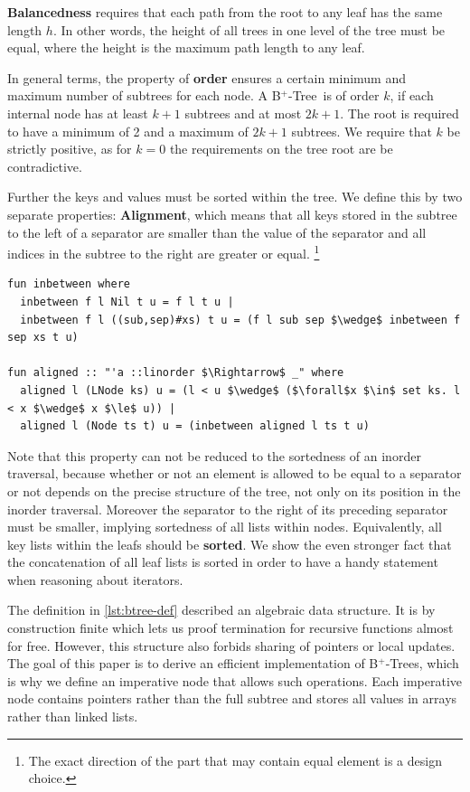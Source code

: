 \documentclass[a4paper,UKenglish,cleveref, autoref, thm-restate]{lipics-v2021}
\newcommand{\btree}{B$^+$-Tree}
\newcommand{\btrees}{B$^+$-Trees}
\begin{document}
\textbf{Balancedness} requires
that each path from the root to any leaf has the same length $h$.
In other words, the height of all trees in one level of the tree must be equal,
where the height is the maximum path length to any leaf.

In general terms, the property of \textbf{order} ensures a certain minimum and maximum
number of subtrees for each node.
A \btree\ is of order $k$, if each internal node has at least $k+1$
subtrees and at most $2k+1$.
The root is required to have a minimum of 2 and a maximum of $2k+1$ subtrees.
We require that $k$ be strictly positive, as for $k = 0$ the requirements on the tree
root are be contradictive.

Further the keys and values must be sorted within the tree.
We define this by two separate properties: \textbf{Alignment}, which means that all keys stored
in the subtree to the left of a separator are smaller than the value of the separator
and all indices in the subtree to the right are greater or equal.
\footnote{
    The exact direction of the part that may contain equal element is a design choice.
}
\begin{lstlisting}[mathescape=true, language=Isabelle,label=lst:btree-alignment-def]
fun inbetween where
  inbetween f l Nil t u = f l t u |
  inbetween f l ((sub,sep)#xs) t u = (f l sub sep $\wedge$ inbetween f sep xs t u)

fun aligned :: "'a ::linorder $\Rightarrow$ _" where
  aligned l (LNode ks) u = (l < u $\wedge$ ($\forall$x $\in$ set ks. l < x $\wedge$ x $\le$ u)) |
  aligned l (Node ts t) u = (inbetween aligned l ts t u)
\end{lstlisting}


Note that this property can not be reduced to the sortedness of an inorder traversal,
because whether or not an element is allowed to be equal to a separator or not
depends on the precise structure of the tree, not only on its position in the inorder traversal.
Moreover the separator to the right of its preceding separator must be smaller,
implying sortedness of all lists within nodes.
Equivalently, all key lists within the leafs should be \textbf{sorted}.
We show the even stronger fact that the concatenation of all leaf lists
is sorted in order to have a handy statement when reasoning about iterators.

The definition in \autoref{lst:btree-def} described an algebraic data structure.
It is by construction finite which lets us proof termination for recursive functions almost for free.
However, this structure also forbids sharing of pointers or local updates.
The goal of this paper is to derive an efficient implementation
of \btrees, which is why we define an imperative node that allows such operations.
Each imperative node contains pointers rather than the full subtree and
stores all values in arrays rather than linked lists.
\end{document}
